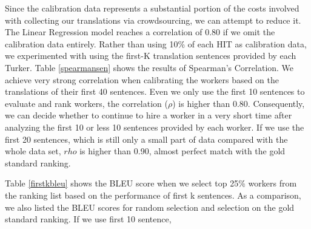 \documentclass[11pt]{article}
\begin{document}
Since the calibration data represents a substantial portion of the costs involved with collecting our translations via crowdsourcing, we can attempt to reduce it.  
 The Linear Regression model reaches a correlation of 0.80 if we omit the calibration data entirely. 
 Rather than using 10\% of each HIT as calibration data, we experimented with using the first-K translation sentences provided by each Turker.  Table \ref{spearmansen} shows the results of Spearman's Correlation.  We achieve  very strong correlation when calibrating the workers based on  the translations of their first 40 sentences.  
  Even we only use the first 10 sentences to evaluate and rank workers, the correlation ($\rho$) is higher than 0.80.  Consequently, we can decide whether to continue to hire a worker in a very short time after analyzing the first 10 or less 10 sentences provided by each worker. If we use the first 20 sentences, which is still only a small  part of data compared with the whole data set, $rho$ is higher than 0.90, almost perfect match with the gold standard ranking.
  
  Table \ref{firstkbleu} shows the BLEU score when we select top 25\% workers from the ranking list based on the performance of first k sentences.  As a comparison, we also listed the  BLEU scores for random selection and selection on the gold standard ranking. If we use first 10 sentence,  

%
%
%
\end{document}
